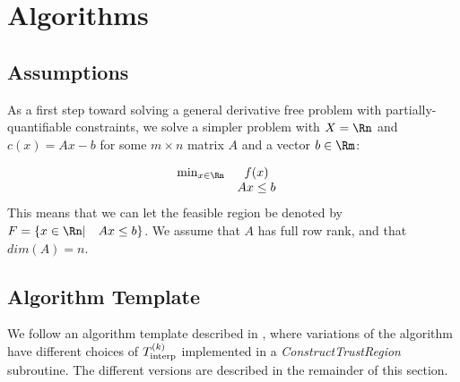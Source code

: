 

\section{Algorithms}

\subsection{Assumptions}
% 
% 
% 
% 


As a first step toward solving a general derivative free problem with partially-quantifiable constraints,
we solve a simpler problem with $\domain = \Rn$ and $c(x) = Ax-b$ for some $m\times n$ matrix $A$ and a vector $b\in \Rm$:

\[ \begin{array}{ccl} \min_{x \in \mathbb \Rn} & f(x) \\
& Ax \le b & 
\end{array}
\]
This means that we can let the feasible region be denoted by $\feasible = \{x \in \Rn | \quad  Ax \le b \}$.
We assume that $A$ has full row rank, and that  $dim(A) = n$.

\subsection{Algorithm Template}

We follow an algorithm template described in \cite{doi:10.1080/10556788.2015.1026968}, where variations of the algorithm have different choices of $ {T_{\text{interp}}^{(k)}} $ implemented in a \emph{ConstructTrustRegion} subroutine.
The different versions are described in the remainder of this section.

